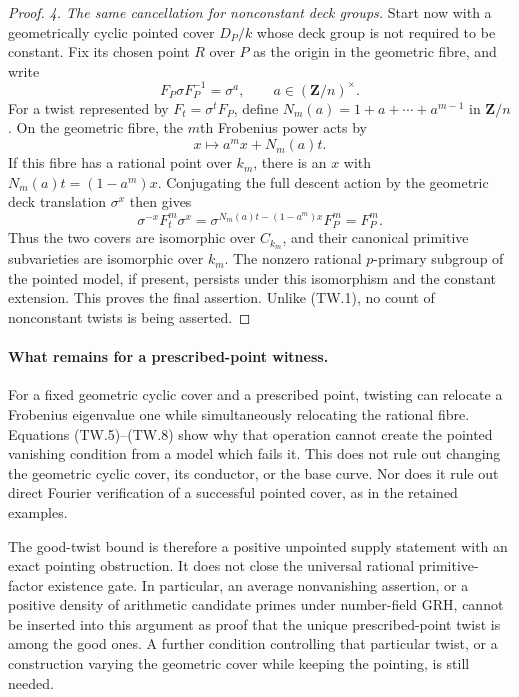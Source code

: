 \documentclass[11pt,a4paper]{article}
\begin{document}
\begin{proof}
\emph{4. The same cancellation for nonconstant deck groups.}
Start now with a geometrically cyclic pointed cover $D_P/k$
whose deck group is not required to be constant. Fix its chosen
point $R$ over $P$ as the origin in the geometric fibre, and
write
\[
 F_P\sigma F_P^{-1}=\sigma^a,\qquad a\in(\mathbf Z/n)^\times.
\]
For a twist represented by $F_t=\sigma^t F_P$, define
$N_m(a)=1+a+\cdots+a^{m-1}$ in $\mathbf Z/n$. On the
geometric fibre, the $m$th Frobenius power acts by
\[
                         x\longmapsto a^m x+N_m(a)t.
 \tag{TW.7}
\]
If this fibre has a rational point over $k_m$, there is an $x$
with $N_m(a)t=(1-a^m)x$. Conjugating the full descent action
by the geometric deck translation $\sigma^x$ then gives
\[
 \sigma^{-x}F_t^m\sigma^x
       =\sigma^{N_m(a)t-(1-a^m)x}F_P^m=F_P^m.
 \tag{TW.8}
\]
Thus the two covers are isomorphic over $C_{k_m}$, and their
canonical primitive subvarieties are isomorphic over $k_m$.
The nonzero rational $p$-primary subgroup of the pointed model,
if present, persists under this isomorphism and the constant
extension. This proves the final assertion. Unlike (TW.1),
no count of nonconstant twists is being asserted.
\end{proof}

\paragraph{What remains for a prescribed-point witness.}
For a fixed geometric cyclic cover and a prescribed point,
twisting can relocate a Frobenius eigenvalue one while
simultaneously relocating the rational fibre. Equations
(TW.5)--(TW.8) show why that operation cannot create the
pointed vanishing condition from a model which fails it.
This does not rule out changing the geometric cyclic cover,
its conductor, or the base curve. Nor does it rule out direct
Fourier verification of a successful pointed cover, as in the
retained examples.

The good-twist bound is therefore a positive unpointed supply
statement with an exact pointing obstruction. It does not
close the universal rational primitive-factor existence gate.
In particular, an average nonvanishing assertion, or a positive
density of arithmetic candidate primes under number-field
GRH, cannot be inserted into this argument as proof that the
unique prescribed-point twist is among the good ones.
A further condition controlling that particular twist, or a
construction varying the geometric cover while keeping the
pointing, is still needed.
\end{document}
